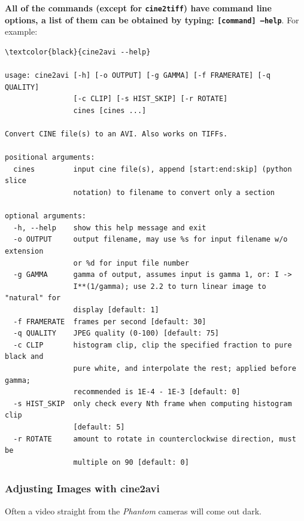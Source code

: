 \documentclass[11pt]{amsart}
\begin{document}
{\bf All of the commands (except for \texttt{cine2tiff}) have command line options, a list of them can be obtained by typing: \texttt{[command] --help}}.
For example:
\begin{Verbatim}[commandchars=\\\{\}, formatcom=\color{red}]
\textcolor{black}{cine2avi --help}

usage: cine2avi [-h] [-o OUTPUT] [-g GAMMA] [-f FRAMERATE] [-q QUALITY]
                [-c CLIP] [-s HIST_SKIP] [-r ROTATE]
                cines [cines ...]

Convert CINE file(s) to an AVI. Also works on TIFFs.

positional arguments:
  cines         input cine file(s), append [start:end:skip] (python slice
                notation) to filename to convert only a section

optional arguments:
  -h, --help    show this help message and exit
  -o OUTPUT     output filename, may use %s for input filename w/o extension
                or %d for input file number
  -g GAMMA      gamma of output, assumes input is gamma 1, or: I ->
                I**(1/gamma); use 2.2 to turn linear image to "natural" for
                display [default: 1]
  -f FRAMERATE  frames per second [default: 30]
  -q QUALITY    JPEG quality (0-100) [default: 75]
  -c CLIP       histogram clip, clip the specified fraction to pure black and
                pure white, and interpolate the rest; applied before gamma;
                recommended is 1E-4 - 1E-3 [default: 0]
  -s HIST_SKIP  only check every Nth frame when computing histogram clip
                [default: 5]
  -r ROTATE     amount to rotate in counterclockwise direction, must be
                multiple on 90 [default: 0]
\end{Verbatim}

\vfill \pagebreak

\subsubsection{Adjusting Images with cine2avi}
Often a video straight from the \emph{Phantom} cameras will come out dark.
\end{document}
